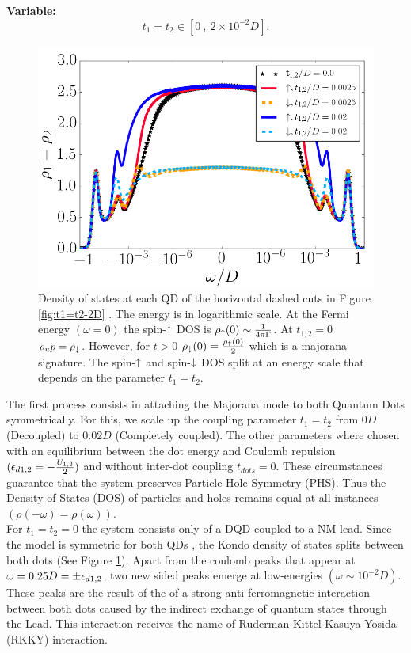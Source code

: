 \documentclass[showpacs,aps,prb,reprint,superscriptaddress]{revtex4-1}
\begin{document}
\textbf{Variable:}
    $$t_1=t_2 \in [0\  ,\  2\times10^{-2}D].$$
    \begin{figure}[bt]
    \centering
    \includegraphics[scale=0.35]{Graficos/LogPlot.png}
    \caption{\label{fig:t1=t2/logplot} Density of states at each QD of the horizontal dashed cuts in Figure \ref{fig:t1=t2-2D} . The energy is in logarithmic scale. At the Fermi energy $(\omega =0)$ the spin-$\uparrow$ DOS is $\rho_\uparrow(0) \sim \frac{1}{4\pi\Gamma}$. At $t_{1,2}=0$ $\rho_up=\rho_\downarrow$. However, for  $t>0$  $\rho_\downarrow(0) = \frac{\rho_\uparrow(0)}{2}$ which is a majorana signature. The spin-$\uparrow$ and spin-$\downarrow$ DOS split at an energy scale that depends on the parameter $t_{1}=t_2$.}
    \end{figure}


    
The first process consists in attaching the Majorana mode to both Quantum Dots symmetrically. For this, we scale up the coupling parameter $t_1=t_2$ from $0D$ (Decoupled) to $0.02D$ (Completely coupled). The other parameters where chosen with an equilibrium between the dot energy and Coulomb repulsion $(\epsilon_{d1,2}=-\frac{U_{1,2}}{2})$  and  without inter-dot coupling $t_{dots}=0$. These circumstances guarantee that the system preserves Particle Hole Symmetry (PHS). Thus the Density of States (DOS) of particles and holes remains equal at all instances $(\rho(-\omega) = \rho(\omega))$. \\
    
For $t_1 =t_2 = 0$ the system consists only of a DQD coupled to a NM lead. Since the model is symmetric for both QDs , the Kondo density of states  splits between both dots (See Figure \ref{fig:t1=t2/logplot}). Apart from the coulomb peaks that appear at $\omega=0.25D=\pm \epsilon_{d1,2}$, two new sided peaks emerge at low-energies $(\omega \sim 10^{-2}D)$. These peaks are the result of the of a strong anti-ferromagnetic interaction between both dots caused by the indirect exchange of quantum states through the Lead. This interaction receives the name of Ruderman-Kittel-Kasuya-Yosida (RKKY) interaction\cite{ruderman_indirect_1954,kasuya_theory_1956,yosida_magnetic_1957}. \\
    
\end{document}
